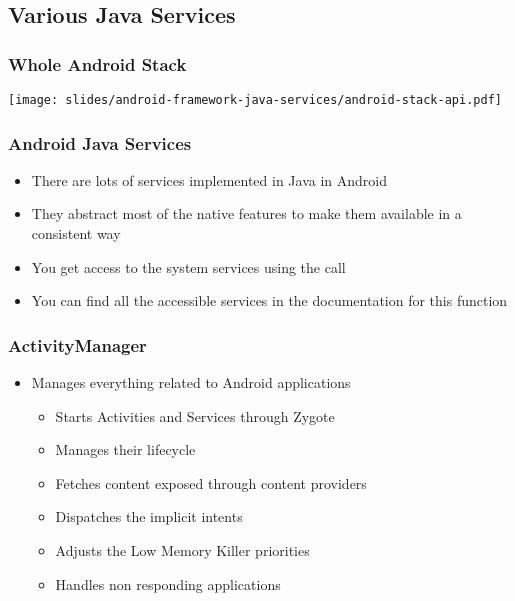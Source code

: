 \subsection{Various Java Services}

\begin{frame}
  \frametitle{Whole Android Stack}
  \begin{center}
    \texttt{[image: slides/android-framework-java-services/android-stack-api.pdf]}
  \end{center}
\end{frame}

\begin{frame}

  \frametitle{Android Java Services}
  \begin{itemize}
  \item There are lots of services implemented in Java in Android
  \item They abstract most of the native features to make them
    available in a consistent way
  \item You get access to the system services using the
     call
  \item You can find all the accessible services in the documentation
    for this function
  \end{itemize}
\end{frame}

\begin{frame}
  \frametitle{ActivityManager}
    \begin{itemize}
    \item Manages everything related to Android applications
      \begin{itemize}
      \item Starts Activities and Services through Zygote
      \item Manages their lifecycle
      \item Fetches content exposed through content providers
      \item Dispatches the implicit intents
      \item Adjusts the Low Memory Killer priorities
      \item Handles non responding applications
      \end{itemize}
  \end{itemize}
\end{frame}


